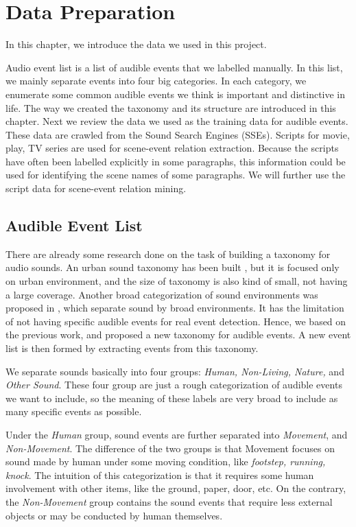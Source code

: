 \chapter{Data Preparation}
In this chapter, we introduce the data we used in this project. 

Audio event list is a list of audible events that we labelled manually.  
In this list, we mainly separate events into four big categories. 
In each category, we enumerate some common audible events we think is important and distinctive in life. 
The way we created the taxonomy and its structure are introduced in this chapter. 
Next we review the data we used as the training data for audible events. 
These data are crawled from the Sound Search Engines (SSEs). 
Scripts for movie, play, TV series are used for scene-event relation extraction. 
Because the scripts have often been labelled explicitly in some paragraphs, this information could be used for identifying the scene names of some paragraphs. 
We will further use the script data for scene-event relation mining. 

\section{Audible Event List} 
There are already some research done on the task of building a taxonomy for audio sounds. 
An urban sound taxonomy has been built \cite{salamon2014dataset}, but it is focused only on urban environment, and the size of taxonomy is also kind of small, not having a large coverage. 
Another broad categorization of sound environments was proposed in \cite{brown2011towards}, which separate sound by broad environments. 
It has the limitation of not having specific audible events for real event detection. 
Hence, we based on the previous work, and proposed a new taxonomy for audible events. 
A new event list is then formed by extracting events from this taxonomy.  

We separate sounds basically into four groups: \textit{Human, Non-Living, Nature,} and \textit{Other Sound}. 
These four group are just a rough categorization of audible events we want to include, so the meaning of these labels are very broad to include as many specific events as possible. 

Under the \textit{Human} group, sound events are further separated into \textit{Movement}, and \textit{Non-Movement}. 
The difference of the two groups is that Movement focuses on sound made by human under some moving condition, like \textit{footstep, running, knock}. 
The intuition of this categorization is that it requires some human involvement with other items, like the ground, paper, door, etc.   
On the contrary, the \textit{Non-Movement} group contains the sound events that require less external objects or may be conducted by human themselves.

